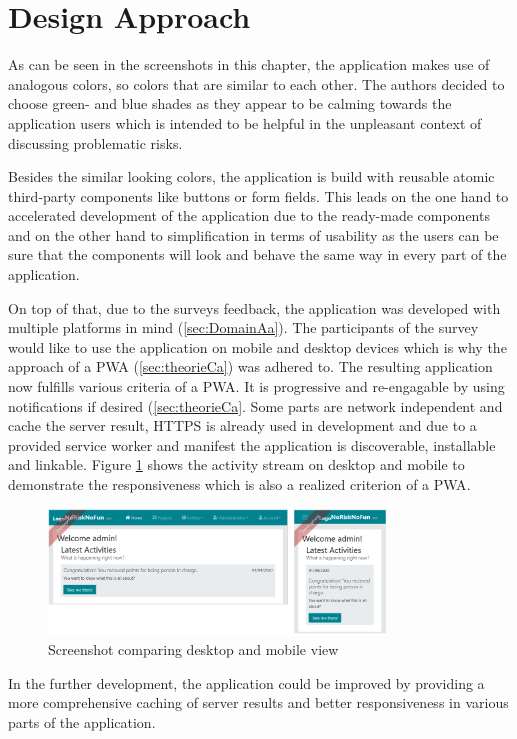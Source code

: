 
\section{Design Approach}
\label{sec:implementationDesign}

As can be seen in the screenshots in this chapter, the application makes use of analogous colors, so colors that are similar to each other. The authors decided to choose green- and blue shades as they appear to be calming towards the application users which is intended to be helpful in the unpleasant context of discussing problematic risks.

Besides the similar looking colors, the application is build with reusable atomic third-party components like buttons or form fields. This leads on the one hand to accelerated development of the application due to the ready-made components and on the other hand to simplification in terms of usability as the users can be sure that the components will look and behave the same way in every part of the application.

On top of that, due to the surveys feedback, the application was developed with multiple platforms in mind (\ref{sec:DomainAa}). The participants of the survey would like to use the application on mobile and desktop devices which is why the approach of a  \acs{PWA} (\ref{sec:theorieCa}) was adhered to. The resulting application now fulfills various criteria of a PWA. It is progressive and re-engagable by using notifications if desired (\ref{sec:theorieCa}. Some parts are network independent and cache the server result, HTTPS is already used in development and due to a provided service worker and manifest the application is discoverable, installable and linkable. Figure \ref{fig:activitystreamcombined} shows the activity stream on desktop and mobile to demonstrate the responsiveness which is also a realized criterion of a  \acs{PWA}.

\begin{figure}[H]
	\centering
	\includegraphics[width=0.8\textwidth]{Assets/implementation_shots/activitystreamcombined.png}
	\caption{Screenshot comparing desktop and mobile view}
	\label{fig:activitystreamcombined}
\end{figure}

In the further development, the application could be improved by providing a more comprehensive caching of server results and better responsiveness in various parts of the application.
